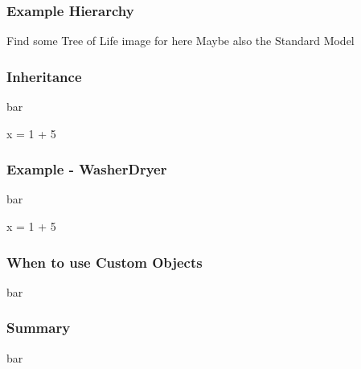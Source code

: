 \documentclass{beamer}
\begin{document}
\begin{frame}[fragile]
\frametitle{Example Hierarchy}
Find some Tree of Life image for here
Maybe also the Standard Model

\end{frame}

\begin{frame}[fragile]
\frametitle{Inheritance}
bar

\begin{code}
x = 1 + 5
\end{code}

\end{frame}

\begin{frame}[fragile]
\frametitle{Example - WasherDryer}
bar
\begin{code}
x = 1 + 5
\end{code}

\end{frame}

\begin{frame}[fragile]
\frametitle{When to use Custom Objects}
bar


\end{frame}

\begin{frame}[fragile]
\frametitle{Summary}
bar


\end{frame}
\end{document}
